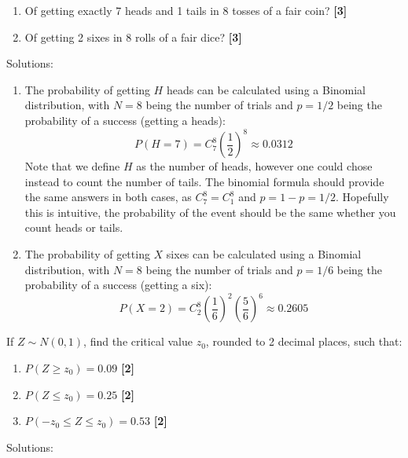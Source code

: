 \documentclass[a4paper, leqno, 12pt]{article} %
\newenvironment{top_enumerate}{
\begin{enumerate}
  \setlength{\itemsep}{2em}
  \setlength{\topsep}{-0pt}
  \setlength{\partopsep}{-0pt}
}{\end{enumerate}}
\begin{document}
\begin{top_enumerate}
\setcounter{equation}{0}  %
\begin{enumerate}
	\setlength{\topsep}{-0pt}
	\setlength{\partopsep}{-0pt}
	\setlength{\itemsep}{10pt}
			\item Of getting exactly {7} heads and {1} tails in {8} tosses of a fair coin?
	 \quad \textbf{[3]}
		\item Of getting {2} sixes in {8} rolls of a fair dice?
	 \quad \textbf{[3]}
\end{enumerate}\addtocounter{enumi}{-1}
\item Solutions:
 
\setcounter{equation}{0}  %
\begin{enumerate}
	\setlength{\topsep}{-0pt}
	\setlength{\partopsep}{-0pt}
	\setlength{\itemsep}{10pt}
			\item The probability of getting $H$ heads can be calculated using a Binomial distribution, with $N={8}$ being the number of trials and $p=1/2$ being the probability of a success (getting a heads):
	\[
	P(H = {7})  = C^{{8}}_{{7}}  \left(\frac{1}{2}\right)^{{8}} \approx {0.0312}
	\]
	Note that we define $H$ as the number of heads, however one could chose instead to count the number of tails. The binomial formula should provide the same answers in both cases, as $C^{{8}}_{{7}} = C^{{8}}_{{1}}$ and $p=1-p=1/2$. Hopefully this is intuitive, the probability of the event should be the same whether you count heads or tails.
	 \quad \textbf{}
		\item The probability of getting $X$ sixes can be calculated using a Binomial distribution, with $N={8}$ being the number of trials and $p=1/6$ being the probability of a success (getting a six):
	\[
	P(X = {2})  = C^{{8}}_{{2}}  \left(\frac{1}{6}\right)^{{2}} \left(\frac{5}{6}\right)^{{6}} \approx {0.2605}
	\]
	 \quad \textbf{}
\end{enumerate}\newpage
\item If $Z \sim N(0,1)$, find the critical value $z_0$, rounded to 2 decimal places, such that:
 
\setcounter{equation}{0}  %
\begin{enumerate}
	\setlength{\topsep}{-0pt}
	\setlength{\partopsep}{-0pt}
	\setlength{\itemsep}{10pt}
			\item $P(Z \ge z_0) = {0.09}$
	 \quad \textbf{[2]}
		\item $P(Z \le z_0) = {0.25}$
	 \quad \textbf{[2]}
		\item $P(-z_0 \le Z \le z_0) = {0.53}$
	 \quad \textbf{[2]}
\end{enumerate}\addtocounter{enumi}{-1}
\item Solutions:


\end{top_enumerate}
\end{document}
